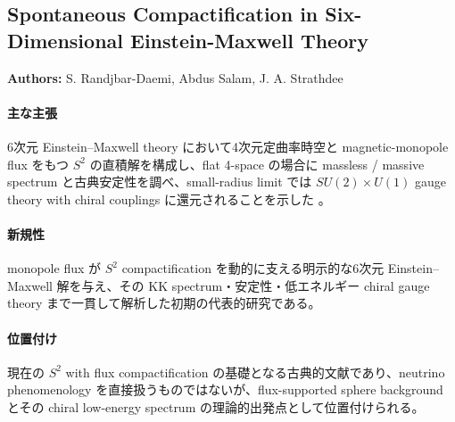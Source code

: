 \subsection{Spontaneous Compactification in Six-Dimensional Einstein-Maxwell Theory}

\textbf{Authors:} S. Randjbar-Daemi, Abdus Salam, J. A. Strathdee

\paragraph{主な主張}
6次元 Einstein--Maxwell theory において4次元定曲率時空と magnetic-monopole flux をもつ $S^2$ の直積解を構成し、flat 4-space の場合に massless / massive spectrum と古典安定性を調べ、small-radius limit では $SU(2)\times U(1)$ gauge theory with chiral couplings に還元されることを示した \cite{RandjbarDaemi:1983EinsteinMaxwell}。

\paragraph{新規性}
monopole flux が $S^2$ compactification を動的に支える明示的な6次元 Einstein--Maxwell 解を与え、その KK spectrum・安定性・低エネルギー chiral gauge theory まで一貫して解析した初期の代表的研究である。

\paragraph{位置付け}
現在の $S^2$ with flux compactification の基礎となる古典的文献であり、neutrino phenomenology を直接扱うものではないが、flux-supported sphere background とその chiral low-energy spectrum の理論的出発点として位置付けられる。